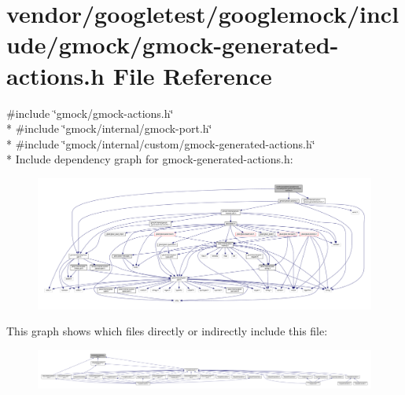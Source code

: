 \hypertarget{gmock-generated-actions_8h}{}\section{vendor/googletest/googlemock/include/gmock/gmock-\/generated-\/actions.h File Reference}
\label{gmock-generated-actions_8h}
{\ttfamily \#include \char`\"{}gmock/gmock-\/actions.\+h\char`\"{}}\\*
{\ttfamily \#include \char`\"{}gmock/internal/gmock-\/port.\+h\char`\"{}}\\*
{\ttfamily \#include \char`\"{}gmock/internal/custom/gmock-\/generated-\/actions.\+h\char`\"{}}\\*
Include dependency graph for gmock-\/generated-\/actions.h\+:\nopagebreak
\begin{figure}[H]
\begin{center}
\leavevmode
\includegraphics[width=350pt]{gmock-generated-actions_8h__incl}
\end{center}
\end{figure}
This graph shows which files directly or indirectly include this file\+:\nopagebreak
\begin{figure}[H]
\begin{center}
\leavevmode
\includegraphics[width=350pt]{gmock-generated-actions_8h__dep__incl}
\end{center}
\end{figure}
